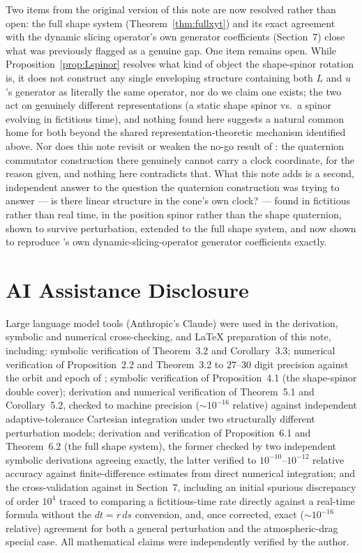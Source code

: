 \documentclass[12pt]{amsart}
\theoremstyle{plain}
\theoremstyle{remark}
\begin{document}
Two items from the original version of this note are now resolved rather than open: the full shape system (Theorem~\ref{thm:fullxyt}) and its exact agreement with the dynamic slicing operator's own generator coefficients (Section~7) close what was previously flagged as a genuine gap. One item remains open. While Proposition~\ref{prop:Lspinor} resolves what kind of object the shape-spinor rotation is, it does not construct any single enveloping structure containing both $L$ and $u$'s generator as literally the same operator, nor do we claim one exists; the two act on genuinely different representations (a static shape spinor vs.\ a spinor evolving in fictitious time), and nothing found here suggests a natural common home for both beyond the shared representation-theoretic mechanism identified above. Nor does this note revisit or weaken the no-go result of \cite{Ebert2026Clock}: the quaternion commutator construction there genuinely cannot carry a clock coordinate, for the reason given, and nothing here contradicts that. What this note adds is a second, independent answer to the question the quaternion construction was trying to answer --- is there linear structure in the cone's own clock? --- found in fictitious rather than real time, in the position spinor rather than the shape quaternion, shown to survive perturbation, extended to the full shape system, and now shown to reproduce \cite{Ebert2026Cone}'s own dynamic-slicing-operator generator coefficients exactly.

\section*{AI Assistance Disclosure}

Large language model tools (Anthropic's Claude) were used in the derivation, symbolic and numerical cross-checking, and \LaTeX{} preparation of this note, including: symbolic verification of Theorem~3.2 and Corollary~3.3; numerical verification of Proposition~2.2 and Theorem~3.2 to $27$--$30$ digit precision against the orbit and epoch of \cite{Ebert2026Clock}; symbolic verification of Proposition~4.1 (the shape-spinor double cover); derivation and numerical verification of Theorem~5.1 and Corollary~5.2, checked to machine precision ($\sim10^{-16}$ relative) against independent adaptive-tolerance Cartesian integration under two structurally different perturbation models; derivation and verification of Proposition~6.1 and Theorem~6.2 (the full shape system), the former checked by two independent symbolic derivations agreeing exactly, the latter verified to $10^{-10}$--$10^{-12}$ relative accuracy against finite-difference estimates from direct numerical integration; and the cross-validation against \cite{Ebert2026Cone} in Section~7, including an initial spurious discrepancy of order $10^4$ traced to comparing a fictitious-time rate directly against a real-time formula without the $dt=r\,ds$ conversion, and, once corrected, exact ($\sim10^{-16}$ relative) agreement for both a general perturbation and the atmospheric-drag special case. All mathematical claims were independently verified by the author.
\end{document}
